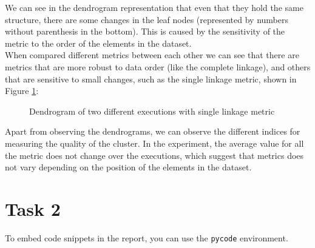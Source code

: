 \documentclass[12pt]{article}
\begin{document}
We can see in the dendrogram representation that even that they hold the same structure, there are some changes in the leaf nodes (represented by numbers without parenthesis in the bottom). This is caused by the sensitivity of the metric to the order of the elements in the dataset.\\

When compared different metrics between each other we can see that there are metrics that are more robust to data order (like the complete linkage), and others that are sensitive to small changes, such as the single linkage metric, shown in Figure \ref{fig:dendro-single-linkage}:

\begin{figure}[H]
\centering
{}
\caption{Dendrogram of two different executions with single linkage metric}
\label{fig:dendro-single-linkage}
\end{figure}

Apart from observing the dendrograms, we can observe the different indices for measuring the quality of the cluster. In the experiment, the average value for all the metric does not change over the executions, which suggest that metrics does not vary depending on the position of the elements in the dataset.

\section{Task 2}
To embed code snippets in the report, you can use the \texttt{pycode} environment.
\end{document}
